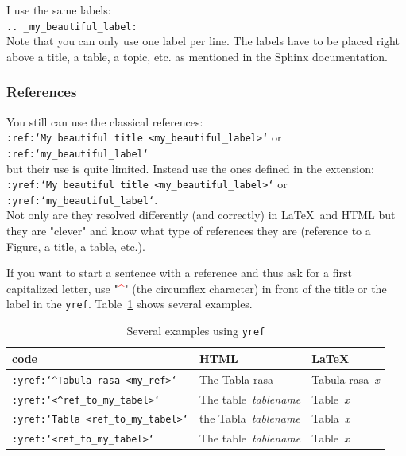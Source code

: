 \documentclass[a4paper,10pt]{article}
\newcommand{\code}[1]{\texttt{#1}}
\begin{document}
I use the same labels:\\

\code{..  \_my\_beautiful\_label:}\\

Note that you can only use one label per line. The labels have to be placed right above a title, a table, a topic, etc. as mentioned in the Sphinx documentation.

\subsubsection{References}

You still can use the classical references:\\

\code{:ref:`My beautiful title <my\_beautiful\_label>`} or \code{:ref:`my\_beautiful\_label`}\\

but their use is quite limited. Instead use the ones defined in the extension:\\

\code{:yref:`My beautiful title <my\_beautiful\_label>`} or \code{:yref:`my\_beautiful\_label`}.\\

Not only are they resolved differently (and correctly) in \LaTeX\ and HTML but they are "clever" and know what type of references they are (reference to a Figure, a title, a table, etc.).

If you want to start a sentence with a reference and thus ask for a first capitalized letter, use "\textcolor{red}{\textrm{\^}}" (the circumflex character) in front of the title or the label in the \code{yref}. Table~\ref{tab_yref} shows several examples.\\

\begin{table}[h!]
\begin{center}
\caption{Several examples using \code{yref}}\label{tab_yref}
\begin{tabular}{lll}
code & HTML & \LaTeX\\
\hline
\code{:yref:`\textrm{\^}Tabula rasa <my\_ref>`} & The Tabla rasa & Tabula rasa~\emph{x}\\
\code{:yref:`<\textrm{\^}ref\_to\_my\_tabel>`} & The table~\emph{tablename} & Table~\emph{x}\\
\code{:yref:`Tabla <ref\_to\_my\_tabel>`} & the Tabla~\emph{tablename} & Tabla~\emph{x}\\
\code{:yref:`<ref\_to\_my\_tabel>`} & The table~\emph{tablename} & Table~\emph{x}
\end{tabular}
\end{center}
\end{table}
\end{document}
